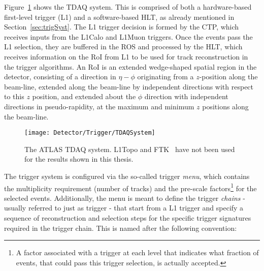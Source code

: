 		Figure~\ref{fig:TDAQSyst} shows the \ac{TDAQ} system. This is comprised of both a hardware-based first-level trigger (\ac{L1}) and a software-based \ac{HLT}, as already mentioned in Section~\ref{sec:trigSyst}. The \ac{L1} trigger decision is formed by the \ac{CTP}, which receives inputs from the \ac{L1Calo} and \ac{L1Muon} triggers. Once the events pass the \ac{L1} selection, they are buffered in the \ac{ROS} and processed by the \ac{HLT}, which receives information on the \ac{RoI} from \ac{L1} to be used for track reconstruction in the trigger algorithms.
		An \ac{RoI} is an extended wedge-shaped spatial region in the detector, consisting of a direction in $\eta-\phi$ originating from a $z$-position along the beam-line, extended along the beam-line by independent directions with respect to this $z$ position, and extended about the $\phi$ direction with independent directions in pseudo-rapidity, at the maximum and minimum $z$ positions along the beam-line. %

		\begin{figure}[!htb]
			\centering
			\texttt{[image: Detector/Trigger/TDAQSystem]}
			\caption{The \ac{ATLAS} \ac{TDAQ} system. \acs{L1Topo} and \ac{FTK}~\cite{ATLASTrigger2015} have not been used for the results shown in this thesis.}
			\label{fig:TDAQSyst}
		\end{figure}

		The trigger system is configured via the so-called trigger \textit{menu}, which contains the multiplicity requirement (number of tracks) and the pre-scale factors\footnote{A factor associated with a trigger at each level that indicates what fraction of events, that could pass this trigger selection, is actually accepted.} for the selected events. Additionally, the menu is meant to define the trigger \textit{chains} - usually referred to just as trigger - that start from a \ac{L1} trigger and specify a sequence of reconstruction and selection steps for the specific trigger signatures required in the trigger chain. This is named after the following convention: 


